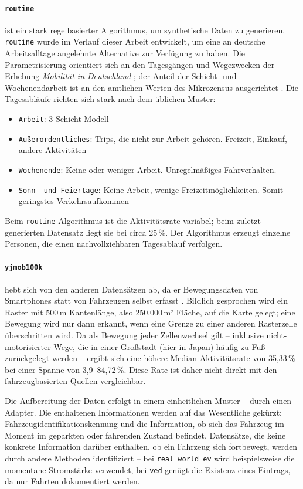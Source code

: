 \paragraph{\texttt{routine}} ist ein stark regelbasierter Algorithmus, um synthetische Daten zu generieren. \texttt{routine} wurde im Verlauf dieser Arbeit entwickelt, um eine an deutsche Arbeitsalltage angelehnte Alternative zur Verfügung zu haben. Die Parametrisierung orientiert sich an den Tagesgängen und Wegezwecken der Erhebung \emph{Mobilität in Deutschland} \parencite{mid2017}; der Anteil der Schicht- und Wochenendarbeit ist an den amtlichen Werten des Mikrozensus ausgerichtet \parencite{destatis_nachtarbeit,destatis_wochenendarbeit}. Die Tagesabläufe richten sich stark nach dem üblichen Muster:
\begin{itemize}
  \item \texttt{Arbeit}: 3-Schicht-Modell
  \item \texttt{Außerordentliches}: Trips, die nicht zur Arbeit gehören. Freizeit, Einkauf, andere Aktivitäten
  \item \texttt{Wochenende}: Keine oder weniger Arbeit. Unregelmäßiges Fahrverhalten.
  \item \texttt{Sonn- und Feiertage}: Keine Arbeit, wenige Freizeitmöglichkeiten. Somit geringstes Verkehrsaufkommen
\end{itemize}
Beim \texttt{routine}-Algorithmus ist die Aktivitätsrate variabel; beim zuletzt generierten Datensatz liegt sie bei circa 25\,\%. Der Algorithmus erzeugt einzelne Personen, die einen nachvollziehbaren Tagesablauf verfolgen.

\paragraph{\texttt{yjmob100k}} hebt sich von den anderen Datensätzen ab, da er Bewegungsdaten von Smartphones statt von Fahrzeugen selbst erfasst \parencite{yjmob100k}. Bildlich gesprochen wird ein Raster mit 500\,m Kantenlänge, also 250.000\,m² Fläche, auf die Karte gelegt; eine Bewegung wird nur dann erkannt, wenn eine Grenze zu einer anderen Rasterzelle überschritten wird. Da als Bewegung jeder Zellenwechsel gilt -- inklusive nicht-motorisierter Wege, die in einer Großstadt (hier in Japan) häufig zu Fuß zurückgelegt werden -- ergibt sich eine höhere Median-Aktivitätsrate von 35,33\,\% bei einer Spanne von 3,9--84,72\,\%. Diese Rate ist daher nicht direkt mit den fahrzeugbasierten Quellen vergleichbar.

Die Aufbereitung der Daten erfolgt in einem einheitlichen Muster -- durch einen Adapter. Die enthaltenen Informationen werden auf das Wesentliche gekürzt: Fahrzeugidentifikationskennung und die Information, ob sich das Fahrzeug im Moment im geparkten oder fahrenden Zustand befindet. Datensätze, die keine konkrete Information darüber enthalten, ob ein Fahrzeug sich fortbewegt, werden durch andere Methoden identifiziert -- bei \texttt{real\_world\_ev} wird beispielsweise die momentane Stromstärke verwendet, bei \texttt{ved} genügt die Existenz eines Eintrags, da nur Fahrten dokumentiert werden.

